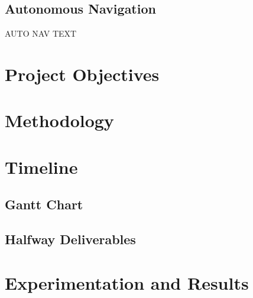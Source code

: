 \documentclass[english]{upeeei}
\begin{document}
\section{Autonomous Navigation}
AUTO NAV TEXT
\chapter{Project Objectives}

\chapter{Methodology}

\chapter{Timeline}
\section{Gantt Chart}
\section{Halfway Deliverables}

\chapter{Experimentation and Results}
\printbibliography[
heading=bibintoc,
title={Bibliography}
]
\end{document}
